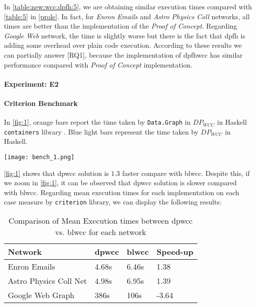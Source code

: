 In \autoref{table:new:wcc:dpfh:5}, we are obtaining similar execution times compared with \autoref{table:5} in \autoref{prole}.
In fact, for \textit{Enron Emails} and \textit{Astro Physics Coll} networks, all times are better than the implementation of the \textit{Proof of Concept}.
Regarding \textit{Google Web} network, the time is slightly worse but there is the fact that \acrshort{dpfh} is adding some overhead over plain code execution.
According to these results we can partially answer [RQ1], because the implementation of \acrshort{dpfhwcc} has similar performance compared with \textit{Proof of Concept} implementation. 

\paragraph{Experiment: E2}\label{sub:new:exp:2}
\paragraph{Criterion Benchmark}
In \autoref{fig:1}, orange bars report the time taken by \texttt{Data.Graph} in $DP_{WCC}$ in Haskell \texttt{containers} library \cite{containers}. Blue light bars represent the time taken by $DP_{WCC}$ in Haskell.

\begin{minipage}[t]{\linewidth}
  \texttt{[image: bench\_1.png]}
  \captionsetup{type=figure}
  \label{fig:1}
\end{minipage}

\autoref{fig:1} shows that \acrshort{dpwcc} solution is $1.3$ faster compare with \acrshort{blwcc}. 
Despite this, if we zoom  in \autoref{fig:1}, it can be observed that \acrshort{dpwcc} solution is slower compared with \acrshort{blwcc}.
Regarding mean execution times for each implementation on each case measure by \texttt{criterion} library, we can display the following results:

\begin{table}[H]
  \centering
  \begin{tabular}{|l|l|l|l|}
   \hline
   \textbf{Network} & \textbf{\acrshort{dpwcc}} & \textbf{\acrshort{blwcc}} & \textbf{Speed-up}\\
   \hline
   Enron Emails & 4.68s &  6.46s & 1.38\\
   \hline
   Astro Physics Coll Net & 4.98s & 6.95s  & 1.39\\
   \hline
   Google Web Graph & 386s & 106s & -3.64\\
   \hline
  \end{tabular}
 \caption{Comparison of Mean Execution times between \acrshort{dpwcc} vs. \acrshort{blwcc} for each network}
 \label{table:6}
 \end{table}

